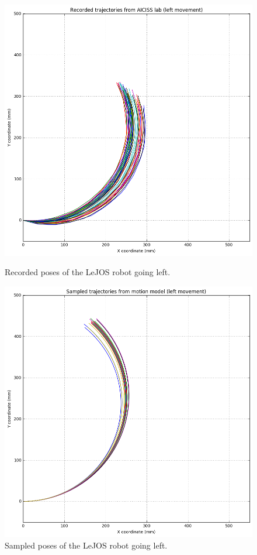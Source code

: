\documentclass[paper=a4, fontsize=11pt]{scrartcl} %
\begin{document}
    \begin{figure}[H]
        \centering
        \begin{minipage}{0.5\textwidth}
            \centering
            \includegraphics[width=1\textwidth]{images/recorded_poses_left.png} %
            \caption{Recorded poses of the LeJOS robot going left.}
        \end{minipage}\hfill
        \begin{minipage}{0.5\textwidth}
            \centering
            \includegraphics[width=1\textwidth]{images/sampled_poses_left.png} %
            \caption{Sampled poses of the LeJOS robot going left.}
        \end{minipage}
    \end{figure}
\end{document}
